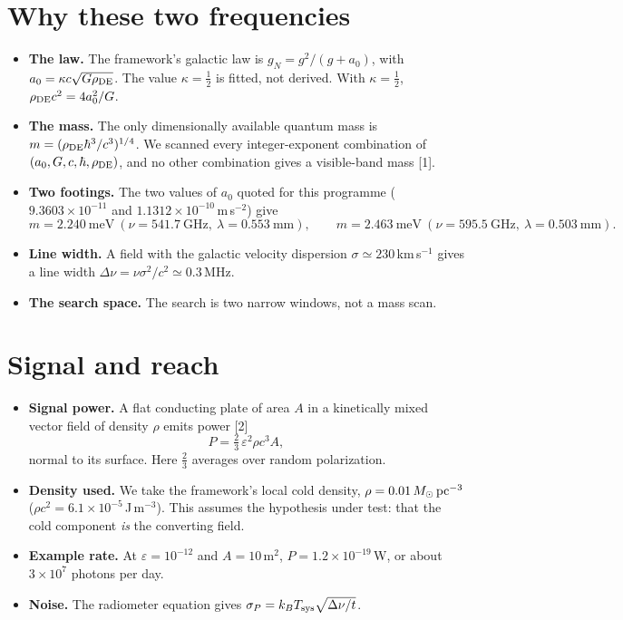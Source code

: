 \documentclass[10pt]{article}
\begin{document}
\section{Why these two frequencies}
\begin{itemize}
\item \textbf{The law.} The framework's galactic law is $g_N=g^2/(g+a_0)$, with $a_0=\kappa c\sqrt{G\rho_{\rm DE}}$. The value $\kappa=\tfrac12$ is fitted, not derived. With $\kappa=\tfrac12$, $\rho_{\rm DE}c^2=4a_0^2/G$.
\item \textbf{The mass.} The only dimensionally available quantum mass is $m=(\rho_{\rm DE}\hbar^3/c^3)^{1/4}$. We scanned every integer-exponent combination of $(a_0,G,c,\hbar,\rho_{\rm DE})$, and no other combination gives a visible-band mass [1].
\item \textbf{Two footings.} The two values of $a_0$ quoted for this programme ($9.3603\times10^{-11}$ and $1.1312\times10^{-10}$\,m\,s$^{-2}$) give
$$m=2.240\ \text{meV}\ (\nu=541.7\ \text{GHz},\ \lambda=0.553\ \text{mm}),\qquad m=2.463\ \text{meV}\ (\nu=595.5\ \text{GHz},\ \lambda=0.503\ \text{mm}).$$
\item \textbf{Line width.} A field with the galactic velocity dispersion $\sigma\simeq230$\,km\,s$^{-1}$ gives a line width $\Delta\nu=\nu\sigma^2/c^2\simeq0.3$\,MHz.
\item \textbf{The search space.} The search is two narrow windows, not a mass scan.
\end{itemize}

\section{Signal and reach}
\begin{itemize}
\item \textbf{Signal power.} A flat conducting plate of area $A$ in a kinetically mixed vector field of density $\rho$ emits power [2]
$$P=\tfrac23\,\varepsilon^2\rho c^3 A,$$
normal to its surface. Here $\tfrac23$ averages over random polarization.
\item \textbf{Density used.} We take the framework's local cold density, $\rho=0.01\,M_\odot\,{\rm pc}^{-3}$ ($\rho c^2=6.1\times10^{-5}$\,J\,m$^{-3}$). This assumes the hypothesis under test: that the cold component \emph{is} the converting field.
\item \textbf{Example rate.} At $\varepsilon=10^{-12}$ and $A=10$\,m$^2$, $P=1.2\times10^{-19}$\,W, or about $3\times10^{7}$ photons per day.
\item \textbf{Noise.} The radiometer equation gives $\sigma_P=k_BT_{\rm sys}\sqrt{\Delta\nu/t}$.
\end{itemize}
\end{document}
